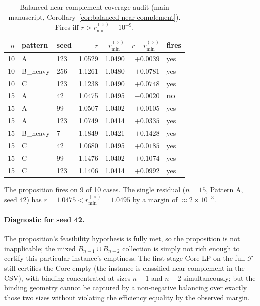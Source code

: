 \documentclass[11pt]{article}
\theoremstyle{plain}
\theoremstyle{definition}
\theoremstyle{remark}
\begin{document}
\begin{table}[htbp]
\centering
\footnotesize
\caption{Balanced-near-complement coverage audit (main manuscript, Corollary~\ref{cor:balanced-near-complement}). Fires iff $r>r^{(\diamond)}_{\min}+10^{-9}$.}
\label{tab:bnc-coverage}
\begin{tabular}{@{}rllrrrl@{}}
\toprule
$n$ & pattern & seed & $r$ & $r^{(\diamond)}_{\min}$ & $r - r^{(\diamond)}_{\min}$ & fires \\
\midrule
10 & A        & 123 & 1.0529 & 1.0490 & $+0.0039$ & yes \\
10 & B\_heavy & 256 & 1.1261 & 1.0480 & $+0.0781$ & yes \\
10 & C        & 123 & 1.1238 & 1.0490 & $+0.0748$ & yes \\
15 & A        &  42 & 1.0475 & 1.0495 & $-0.0020$ & \textbf{no} \\
15 & A        &  99 & 1.0507 & 1.0402 & $+0.0105$ & yes \\
15 & A        & 123 & 1.0749 & 1.0414 & $+0.0335$ & yes \\
15 & B\_heavy &   7 & 1.1849 & 1.0421 & $+0.1428$ & yes \\
15 & C        &  42 & 1.0680 & 1.0495 & $+0.0185$ & yes \\
15 & C        &  99 & 1.1476 & 1.0402 & $+0.1074$ & yes \\
15 & C        & 123 & 1.1406 & 1.0414 & $+0.0992$ & yes \\
\bottomrule
\end{tabular}
\end{table}

The proposition fires on 9 of 10 cases. The single residual ($n=15$, Pattern A, seed 42) has $r=1.0475<r^{(\diamond)}_{\min}=1.0495$ by a margin of $\approx 2\times 10^{-3}$.

\paragraph{Diagnostic for seed 42.} The proposition's feasibility hypothesis is fully met, so the proposition is not inapplicable; the mixed $B_{n-1}\cup B_{n-2}$ collection is simply not rich enough to certify this particular instance's emptiness. The first-stage Core LP on the full $\mathcal{F}$ still certifies the Core empty (the instance is classified near-complement in the CSV), with binding concentrated at sizes $n-1$ and $n-2$ simultaneously; but the binding geometry cannot be captured by a non-negative balancing over exactly those two sizes without violating the efficiency equality by the observed margin.
\end{document}
